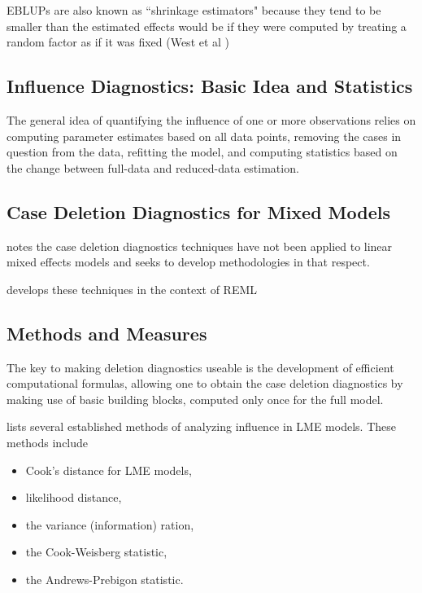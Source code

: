 \documentclass[Main.tex]{subfiles}
\begin{document}
EBLUPs are also known as ``shrinkage estimators" because they tend to be smaller than the estimated effects would be if they were computed by treating a random factor as if it was fixed (West et al )




\newpage


\subsection{Influence Diagnostics: Basic Idea and Statistics} %

The general idea of quantifying the influence of one or more observations relies on computing parameter estimates based on all data points, removing the cases in question from the data, refitting the model, and computing statistics based on the change between full-data and reduced-data estimation. 




\subsection{Case Deletion Diagnostics for Mixed Models}

\citet{Christiansen} notes the case deletion diagnostics techniques have not been applied to linear mixed effects models and seeks to develop methodologies in that respect.

\citet{Christiansen} develops these techniques in the context of REML

\subsection{Methods and Measures}
The key to making deletion diagnostics useable is the development of efficient computational formulas, allowing one to obtain the  case deletion diagnostics by making use of basic building blocks, computed only once for the full model.

\citet{Zewotir} lists several established methods of analyzing influence in LME models. These methods include \begin{itemize}
	\item Cook's distance for LME models,
	\item {} likelihood distance,
	\item the variance (information) ration,
	\item the  Cook-Weisberg statistic,
	\item the  Andrews-Prebigon statistic.
\end{itemize}
\end{document}
